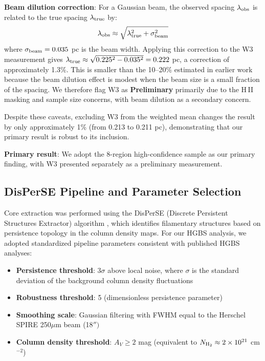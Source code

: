\documentclass[11pt,a4paper]{article}
\begin{document}
\textbf{Beam dilution correction}: For a Gaussian beam, the observed spacing $\lambda_{\rm obs}$ is related to the true spacing $\lambda_{\rm true}$ by:
\begin{equation}
\lambda_{\rm obs} \approx \sqrt{\lambda_{\rm true}^2 + \sigma_{\rm beam}^2}
\end{equation}
where $\sigma_{\rm beam} = 0.035$ pc is the beam width. Applying this correction to the W3 measurement gives $\lambda_{\rm true} \approx \sqrt{0.225^2 - 0.035^2} = 0.222$ pc, a correction of approximately 1.3\%. This is smaller than the 10--20\% estimated in earlier work because the beam dilution effect is modest when the beam size is a small fraction of the spacing. We therefore flag W3 as \textbf{Preliminary} primarily due to the H\,{\scriptsize II} masking and sample size concerns, with beam dilution as a secondary concern.

Despite these caveats, excluding W3 from the weighted mean changes the result by only approximately 1\% (from 0.213 to 0.211 pc), demonstrating that our primary result is robust to its inclusion.

\textbf{Primary result}: We adopt the 8-region high-confidence sample as our primary finding, with W3 presented separately as a preliminary measurement.

\subsection{DisPerSE Pipeline and Parameter Selection}

Core extraction was performed using the DisPerSE (Discrete Persistent Structures Extractor) algorithm \citep{Sousbie2011}, which identifies filamentary structures based on persistence topology in the column density maps. For our HGBS analysis, we adopted standardized pipeline parameters consistent with published HGBS analyses:

\begin{itemize}
    \item \textbf{Persistence threshold}: $3\sigma$ above local noise, where $\sigma$ is the standard deviation of the background column density fluctuations
    \item \textbf{Robustness threshold}: 5 (dimensionless persistence parameter)
    \item \textbf{Smoothing scale}: Gaussian filtering with FWHM equal to the Herschel SPIRE 250$\mu$m beam (18$'')$
    \item \textbf{Column density threshold}: $A_V \geq 2$ mag (equivalent to $N_{\rm H_2} \approx 2 \times 10^{21}$ cm$^{-2}$)
\end{itemize}
\end{document}
